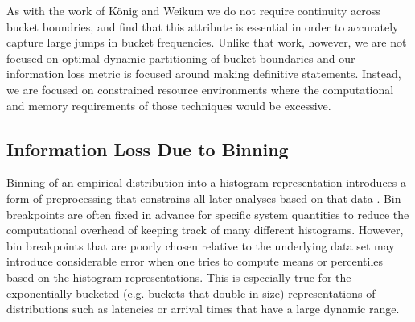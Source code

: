 \documentclass[preprint]{sig-alternate-per}
\begin{document}
As with the work of K{\"o}nig and Weikum \cite{konig1999combining} we
do not require continuity across bucket boundries, and
find that this attribute is essential in order to accurately capture
large jumps in bucket frequencies.  Unlike that work, however, we are
not focused on optimal dynamic partitioning of bucket boundaries and
our information loss metric is focused around making definitive statements.
Instead, we are
focused on constrained resource environments where the computational
and memory requirements of those techniques would be excessive.




\subsection{Information Loss Due to Binning}

Binning of an empirical
distribution into a histogram representation introduces a form of
preprocessing that constrains all later analyses based on that data
\cite{blocker2013potential}.  Bin breakpoints are often fixed in
advance for specific system quantities to reduce the computational
overhead of keeping track of many different histograms.
However, bin breakpoints that are
poorly chosen relative to the underlying data set may introduce
considerable error when one tries to compute means or percentiles
based on the histogram representations.  This is especially true for
the exponentially bucketed (e.g. buckets that double in size)
representations of distributions such as
latencies or arrival times that have a large dynamic range.
\end{document}
